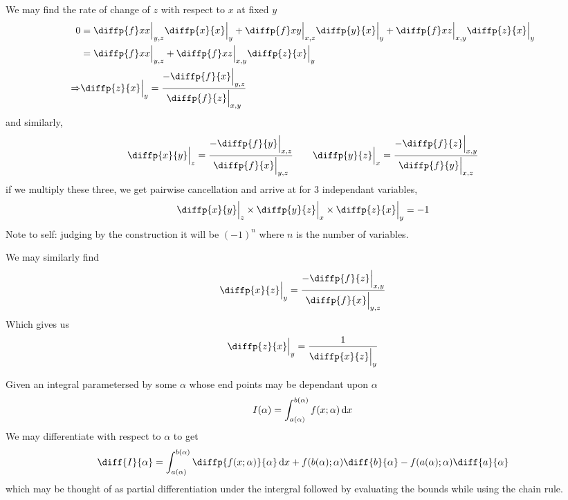 \documentclass{article}
\begin{document}
\begin{cor}
    We may find the rate of change of $z$ with respect to $x$ at fixed $y$
    \begin{align*}
        0 &= \diffp{f}x{x}\Big{|}_{y,z} \diffp{x}{x}\Big{|}_{y} + \diffp{f}x{y}\Big{|}_{x,z} \diffp{y}{x}\Big{|}_{y} + \diffp{f}x{z}\Big{|}_{x,y} \diffp{z}{x}\Big{|}_{y} \\
        &= \diffp{f}x{x}\Big{|}_{y,z} + \diffp{f}x{z}\Big{|}_{x,y} \diffp{z}{x}\Big{|}_{y} \\
        \Rightarrow& \diffp{z}{x}\Big{|}_{y} = \frac{-\diffp{f}{x}\Big{|}_{y,z}}{\diffp{f}{z}\Big{|}_{x,y}}
    \end{align*}
    and similarly,
    \[
        \diffp{x}{y}\Big{|}_{z} = \frac{-\diffp{f}{y}\Big{|}_{x,z}}{\diffp{f}{x}\Big{|}_{y, z}} \qquad \diffp{y}{z}\Big{|}_{x} = \frac{-\diffp{f}{z}\Big{|}_{x,y}}{\diffp{f}{y}\Big{|}_{x,z}}
    \]
    if we multiply these three, we get pairwise cancellation and arrive at for 3 independant variables,
    \[
        \diffp{x}{y}\Big{|}_{z} \times \diffp{y}{z}\Big{|}_{x} \times \diffp{z}{x}\Big{|}_{y} = -1
    \]
    Note to self: judging by the construction it will be $(-1)^n$ where $n$ is the number of variables.
\end{cor}

\begin{defi}
    We may similarly find
    \[
        \diffp{x}{z}\Big{|}_{y} = \frac{-\diffp{f}{z}\Big{|}_{x,y}}{\diffp{f}{x}\Big{|}_{y,z}}
    \]
    Which gives us
    \[
        \diffp{z}{x}\Big{|}_{y} = \frac{1}{\diffp{x}{z}\Big{|}_{y}}
    \]
\end{defi}

\begin{thm}
    Given an integral parametersed by some $\alpha$ whose end points may be dependant upon $\alpha$
    \[
        I(\alpha) = \int_{a(\alpha)}^{b(\alpha)}{f(x ; \alpha) \mathop{}\!\mathrm{d} x}
    \]
    We may differentiate with respect to $\alpha$ to get
    \[
        \diff{I}{\alpha} = \int_{a(\alpha)}^{b(\alpha)}{\diffp{f(x ; \alpha)}{\alpha} \diffd x} + f(b(\alpha); \alpha) \diff{b}{\alpha} - f(a(\alpha); \alpha) \diff{a}{\alpha}
    \]
    which may be thought of as partial differentiation under the intergral followed by evaluating the bounds while using the chain rule. 
\end{thm}
\end{document}
